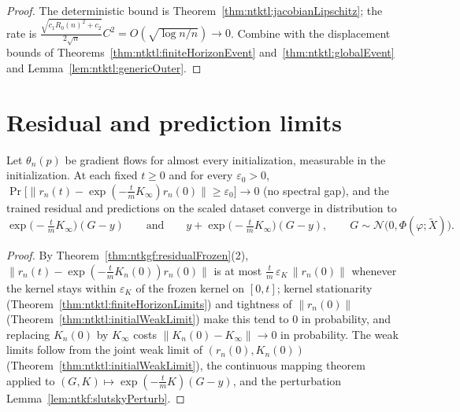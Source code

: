 \begin{proof}
  \leanok
The deterministic bound is Theorem~\ref{thm:ntktl:jacobianLipschitz}; the rate is $\frac{\sqrt{c_1R_0(n)^2+c_2}}{2\sqrt n}C^2=O(\sqrt{\log n/n})\to0$. Combine with the displacement bounds of Theorems~\ref{thm:ntktl:finiteHorizonEvent} and~\ref{thm:ntktl:globalEvent} and Lemma~\ref{lem:ntktl:genericOuter}.
\end{proof}


\section{Residual and prediction limits}\label{sec:ntktl:prediction}

\begin{theorem}\label{thm:ntktl:residualLimit}
  \leanok
Let $\theta_n(p)$ be gradient flows for almost every initialization, measurable in the initialization. At each fixed $t\ge0$ and for every $\varepsilon_0>0$,
$\Pr\bigl[\|r_n(t)-\exp(-\tfrac tmK_\infty)r_n(0)\|\ge\varepsilon_0\bigr]\to0$ (no spectral gap), and the trained residual and predictions on the scaled dataset converge in distribution to
\[
  \exp\bigl(-\tfrac tmK_\infty\bigr)(G-y)\qquad\text{and}\qquad y+\exp\bigl(-\tfrac tmK_\infty\bigr)(G-y),\qquad G\sim\mathcal N\bigl(0,\Phi(\varphi;\tilde X)\bigr).
\]
\end{theorem}

\begin{proof}
  \leanok
By Theorem~\ref{thm:ntkgf:residualFrozen}(2), $\|r_n(t)-\exp(-\frac tmK_n(0))r_n(0)\|$ is at most $\frac tm\,\varepsilon_K\,\|r_n(0)\|$ whenever the kernel stays within $\varepsilon_K$ of the frozen kernel on $[0,t]$; kernel stationarity (Theorem~\ref{thm:ntktl:finiteHorizonLimits}) and
tightness of $\|r_n(0)\|$ (Theorem~\ref{thm:ntktl:initialWeakLimit}) make this tend to $0$ in probability, and replacing $K_n(0)$ by $K_\infty$ costs $\|K_n(0)-K_\infty\|\to0$ in probability. The weak limits follow from the joint weak limit of $(r_n(0),K_n(0))$ (Theorem~\ref{thm:ntktl:initialWeakLimit}), the continuous mapping theorem applied to
$(G,K)\mapsto\exp(-\frac tmK)(G-y)$, and the perturbation Lemma~\ref{lem:ntkf:slutskyPerturb}.
\end{proof}

